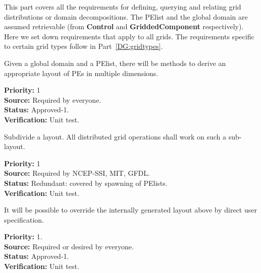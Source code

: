 %


This part covers all the requirements for defining, querying and
relating grid distributions or domain decompositions. The PElist and
the global domain are assumed retrievable (from \textbf{Control} and
\textbf{GriddedComponent} respectively). Here we set down requirements
that apply to all grids. The requirements specific to certain grid
types follow in Part~\ref{DG:gridtypes}.



Given a global domain and a PElist, there will be methods to derive an
appropriate layout of PEs in multiple dimensions.

\begin{reqlist}
{\bf Priority:} 1\\
{\bf Source:} Required by everyone. \\
{\bf Status:} Approved-1. \\
{\bf Verification:} Unit test.
\end{reqlist}


Subdivide a layout.  All distributed grid operations shall work 
on such a sub-layout.

\begin{reqlist}
{\bf Priority:} 1 \\
{\bf Source:} Required by NCEP-SSI, MIT, GFDL. \\
{\bf Status:} Redundant: covered by spawning of PElists. \\
{\bf Verification:} Unit test.
\end{reqlist}


It will be possible to override the internally generated layout above
by direct user specification.

\begin{reqlist}
{\bf Priority:} 1. \\ 
{\bf Source:} Required or desired by everyone. \\
{\bf Status:} Approved-1. \\
{\bf Verification:} Unit test.
\end{reqlist}

